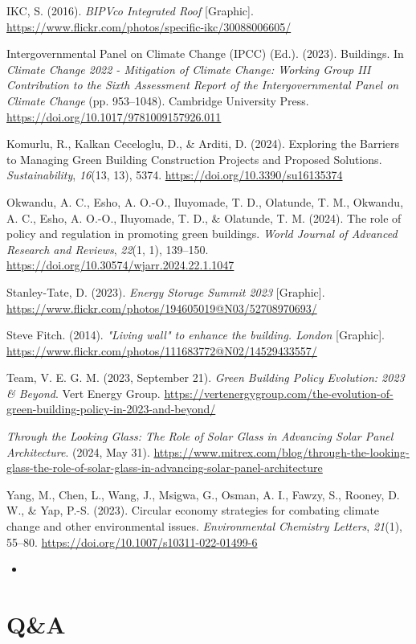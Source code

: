 \documentclass[
  letterpaper,
  DIV=11,
  numbers=noendperiod]{scrartcl}
\providecommand{\tightlist}{%
  \setlength{\itemsep}{0pt}\setlength{\parskip}{0pt}}\usepackage{longtable,booktabs,array}
\newlength{\cslhangindent}
\newenvironment{CSLReferences}[2] %
 {\begin{list}{}{%
  \setlength{\itemindent}{0pt}
  \setlength{\leftmargin}{0pt}
  \setlength{\parsep}{0pt}
  \ifodd #1
   \setlength{\leftmargin}{\cslhangindent}
   \setlength{\itemindent}{-1\cslhangindent}
  \fi
  \setlength{\itemsep}{#2\baselineskip}}}
 {\end{list}}
\begin{document}
\begin{CSLReferences}{1}{0}
IKC, S. (2016). \emph{{BIPVco Integrated Roof}} {[}Graphic{]}.
\url{https://www.flickr.com/photos/specific-ikc/30088006605/}

Intergovernmental Panel on Climate Change (IPCC) (Ed.). (2023).
Buildings. In \emph{Climate {Change} 2022 - {Mitigation} of {Climate
Change}: {Working Group III Contribution} to the {Sixth Assessment
Report} of the {Intergovernmental Panel} on {Climate Change}} (pp.
953--1048). Cambridge University Press.
\url{https://doi.org/10.1017/9781009157926.011}

Komurlu, R., Kalkan Ceceloglu, D., \& Arditi, D. (2024). Exploring the
{Barriers} to {Managing Green Building Construction Projects} and
{Proposed Solutions}. \emph{Sustainability}, \emph{16}(13, 13), 5374.
\url{https://doi.org/10.3390/su16135374}

Okwandu, A. C., Esho, A. O.-O., Iluyomade, T. D., Olatunde, T. M.,
Okwandu, A. C., Esho, A. O.-O., Iluyomade, T. D., \& Olatunde, T. M.
(2024). The role of policy and regulation in promoting green buildings.
\emph{World Journal of Advanced Research and Reviews}, \emph{22}(1, 1),
139--150. \url{https://doi.org/10.30574/wjarr.2024.22.1.1047}

Stanley-Tate, D. (2023). \emph{Energy {Storage Summit} 2023}
{[}Graphic{]}.
\url{https://www.flickr.com/photos/194605019@N03/52708970693/}

Steve Fitch. (2014). \emph{"{Living} wall" to enhance the building.
{London}} {[}Graphic{]}.
\url{https://www.flickr.com/photos/111683772@N02/14529433557/}

Team, V. E. G. M. (2023, September 21). \emph{Green {Building Policy
Evolution}: 2023 \& {Beyond}}. Vert Energy Group.
\url{https://vertenergygroup.com/the-evolution-of-green-building-policy-in-2023-and-beyond/}

\emph{Through the {Looking Glass}: {The Role} of {Solar Glass} in
{Advancing Solar Panel Architecture}}. (2024, May 31).
\url{https://www.mitrex.com/blog/through-the-looking-glass-the-role-of-solar-glass-in-advancing-solar-panel-architecture}

Yang, M., Chen, L., Wang, J., Msigwa, G., Osman, A. I., Fawzy, S.,
Rooney, D. W., \& Yap, P.-S. (2023). Circular economy strategies for
combating climate change and other environmental issues.
\emph{Environmental Chemistry Letters}, \emph{21}(1), 55--80.
\url{https://doi.org/10.1007/s10311-022-01499-6}

\end{CSLReferences}

\begin{itemize}
\tightlist
\item
\end{itemize}

\section{Q\&A}\label{qa}
\end{document}
